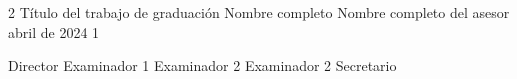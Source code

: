 \documentclass[letterpaper,12pt]{thesisECFM}
\begin{document}
	
	\datosThesis%
	{2}%
	{Título del trabajo de graduación}%
	{Nombre completo}%
	{Nombre completo del asesor}%
	{abril de 2024}		%
	{1}							%
	
	\examenPrivado%
	{Director}%
	{Examinador 1}%
	{Examinador 2}%
	{Examinador 2}%
	{Secretario }%
	{\onehalfspacing	%
		
		
		
		
		\par}
	
	\frontmatter    %
	
	{\onehalfspacing	%
		
		\tableofcontents    %
		
		
		
		
		
		\mainmatter     %
		
		
		
		
		{\backmatter     %
			
			
			\renewcommand{\bibname}{BIBLIOGRAFÍA}
			\nocite{*}			%
			
			
		}
		
		
		
		\par}               %
	
\end{document}
